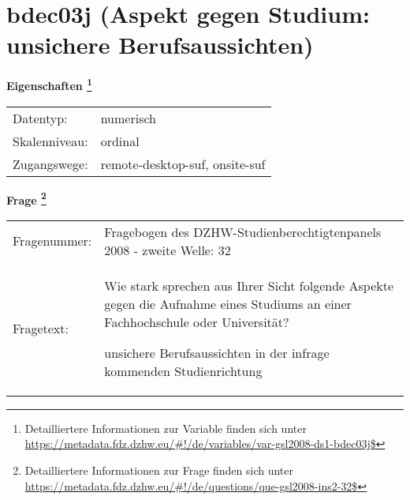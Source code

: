 
    \setcounter{footnote}{0}

    \vspace*{-1.8cm}
	\section{bdec03j (Aspekt gegen Studium: unsichere Berufsaussichten)}
	\label{section:bdec03j}



    \vspace*{0.5cm}
    \noindent\textbf{Eigenschaften
	\footnote{Detailliertere Informationen zur Variable finden sich unter
		\url{https://metadata.fdz.dzhw.eu/\#!/de/variables/var-gsl2008-ds1-bdec03j$}}}\\
	\begin{tabularx}{\hsize}{@{}lX}
	Datentyp: & numerisch \\
	Skalenniveau: & ordinal \\
	Zugangswege: &
	  remote-desktop-suf, 
	  onsite-suf
 \\
    \end{tabularx}



				\vspace*{0.5cm}
                \noindent\textbf{Frage
	                \footnote{Detailliertere Informationen zur Frage finden sich unter
		              \url{https://metadata.fdz.dzhw.eu/\#!/de/questions/que-gsl2008-ins2-32$}}}\\
				\begin{tabularx}{\hsize}{@{}lX}
					Fragenummer: &
					  Fragebogen des DZHW-Studienberechtigtenpanels 2008 - zweite Welle:
					  32
 \\
					Fragetext: & Wie stark sprechen aus Ihrer Sicht folgende Aspekte gegen die Aufnahme eines Studiums an einer Fachhochschule oder Universität?\par  unsichere Berufsaussichten in der infrage kommenden Studienrichtung \\
				\end{tabularx}






